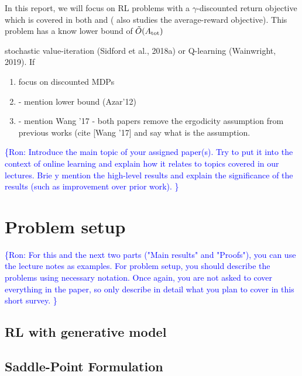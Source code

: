 \documentclass{article}
\newcommand{\ra}[1]{\textcolor{blue}{\{Ron: #1\}}}
\DeclarePairedDelimiter\br{(}{)}%
\newcommand{\ntext}[1]{{\text{\normalfont#1}}}
\newcommand{\Atot}{A_{\ntext{tot}}}
\begin{document}
In this report, we will focus on RL problems with a  $\gamma$-discounted return objective which is covered in both \citet{cheng2020reduction}  and \citet{jin20efficiently}  (\citet{jin20efficiently} also studies the average-reward objective).
This problem has a know lower bound  of $\tilde{O}\br{\Atot} $

stochastic value-iteration (Sidford
et al., 2018a) or Q-learning (Wainwright, 2019). If



\begin{enumerate}
    \item focus on discounted MDPs
    \item  - mention lower bound (Azar'12)
    \item - mention Wang '17 - both papers remove the ergodicity assumption from previous works (cite [Wang '17] and say what is the assumption.
\end{enumerate}


 
 
\ra{
Introduce the main topic of your assigned paper(s). Try to put it into the
context of online learning and explain how it relates to topics covered in our lectures.
Brie
y mention the high-level results and explain the significance of the results (such as
improvement over prior work).
}


\section{Problem setup}
\ra{
For this and the next two parts ("Main results" and "Proofs"), you can use
the lecture notes as examples. For problem setup, you should describe the problems using
necessary notation. Once again, you are not asked to cover everything in the paper, so only
describe in detail what you plan to cover in this short survey.
}

\subsection{RL with generative model}




\subsection{Saddle-Point Formulation}
\end{document}
